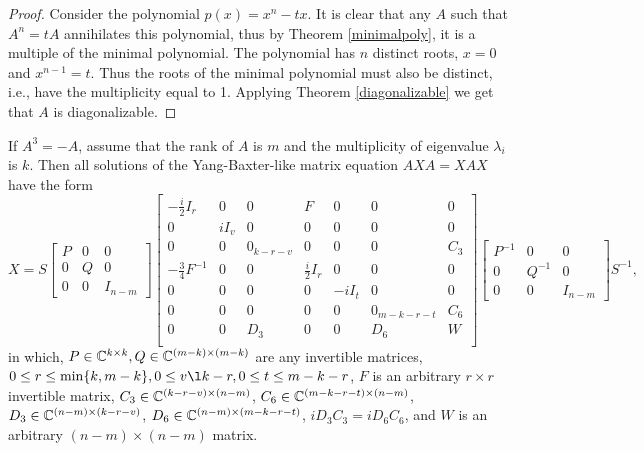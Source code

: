 \documentclass{article}
\begin{document}
\begin{proof}
  Consider the polynomial $p(x) = x^n - t x$.
  It is clear that any $A$ such that $A^n = t A$ annihilates this polynomial, thus by Theorem \ref{minimalpoly}, it is a multiple of the minimal polynomial.
  The polynomial has $n$ distinct roots, $x = 0$ and $x^{n - 1} = t$.
  Thus the roots of the minimal polynomial must also be distinct, i.e., have the multiplicity equal to 1.
  Applying Theorem \ref{diagonalizable} we get that $A$ is diagonalizable.
\end{proof}

\begin{theorem}
  If $A^3 = -A$, assume that the rank of $A$ is $m$ and the multiplicity of eigenvalue $\lambda_i$ is $k$.
  Then all solutions of the Yang-Baxter-like matrix equation $A X A = X A X$ have the form
  \[X = S \begin{bmatrix} P & 0 & 0\\ 0 & Q & 0\\ 0 & 0 & I_{n - m} \end{bmatrix} \left[ \begin{array}{ccc|ccc|c} - \frac{i}{2} I_r & 0 & 0 & F & 0 & 0 & 0 \\ 0 & i I_v & 0 & 0 & 0 & 0 & 0 \\ 0 & 0 & 0_{k - r - v} & 0 & 0 & 0 & C_3 \\ \hline - \frac{3}{4} F^{-1} & 0 & 0 & \frac{i}{2} I_r & 0 & 0 & 0 \\ 0 & 0 & 0 & 0 & - i I_t & 0 & 0 \\ 0 & 0 & 0 & 0 & 0 & 0_{m - k - r - t} & C_6 \\ \hline 0 & 0 & D_3 & 0 & 0 & D_6 & W \\ \end{array} \right] \begin{bmatrix} P^{-1} & 0 & 0\\ 0 & Q^{-1} & 0\\ 0 & 0 & I_{n - m} \end{bmatrix} S^{-1},\]
  in which, $P \in \mathbb{C}^{k \times k}, Q \in \mathbb{C}^{(m - k) \times (m - k)}$ are any invertible matrices, $0 \le r \le \min \{k, m - k\}, 0 \le v \l k - r, 0 \le t \le m - k - r$, $F$ is an arbitrary $r \times r$ invertible matrix, $C_3 \in \mathbb{C}^{(k - r - v) \times (n - m)}$, $C_6 \in \mathbb{C}^{(m - k - r - t) \times (n - m)}$, $D_3 \in \mathbb{C}^{(n - m) \times (k - r - v)}$, $D_6 \in \mathbb{C}^{(n - m) \times (m - k - r - t)}$, $i D_3 C_3 = i D_6 C_6$, and $W$ is an arbitrary $(n - m) \times (n - m)$ matrix.
\end{theorem}
\end{document}
